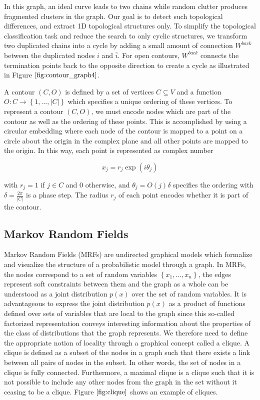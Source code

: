 \documentclass{SMBV12}
\begin{document}
In this graph, an ideal curve leads to two chains while random clutter produces fragmented clusters in the graph. Our goal is to detect such topological differences, and extract 1D topological structures only. To simplify the topological classification task and reduce the search to only cyclic structures, we transform two duplicated chains into a cycle by adding a small amount of connection $W^{back}$ between the duplicated nodes $i$ and $\bar{i}$. For open contours, $W^{back}$ connects the termination points back to the opposite direction to create a cycle as illustrated in Figure $\ref{fig:contour_graph4}$.

A contour $(C, O)$ is defined by a set of vertices $C \subseteq V$ and a function $O: C \rightarrow \left\lbrace 1, ..., \lvert C \rvert \right\rbrace$ which specifies a unique ordering of these vertices. To represent a contour $(C, O)$, we must encode nodes which are part of the contour as well as the ordering
of these points. This is accomplished by using a circular embedding where each node of the contour is mapped to a point on a circle about the origin in the complex plane and all other points are mapped to the origin. In this way, each point is represented as complex number

\begin{equation}
x_j = r_j \exp(i \theta_j)
\end{equation}

with $r_j = 1$ if $j \in C$ and $0$ otherwise, and $\theta_j = O(j) \delta$ specifies the ordering with $\delta = \frac{2\pi}{\lvert C \rvert}$ is a phase step. The radius $r_j$ of each point encodes whether it is part of the contour.

\subsection{Markov Random Fields}
\label{sec:mrf}
Markov Random Fields (MRFs) are undirected graphical models which formalize and visualize the structure of a probabilistic model through a graph. In MRFs, the nodes correspond to a set of random variables $\left\lbrace x_1, ..., x_n\right\rbrace $, the edges represent soft constraints between them and the graph as a whole can be understood as a joint distribution $p(x)$ over the set of random variables. It is advantageous to express the joint distribution $p(x)$ as a product of functions defined over sets of variables that are local to the graph since this so-called factorized representation conveys interesting information about the properties of the class of distributions that the graph represents. We therefore need to define the appropriate notion of locality through a graphical concept called a clique. A clique is defined as a subset of the nodes in a graph such that there exists a link between all pairs of nodes in the subset. In other words, the set of nodes in a clique is fully connected. Furthermore, a maximal clique is a clique such that it is not possible to include any
other nodes from the graph in the set without it ceasing to be a clique. Figure $\ref{fig:clique}$ shows an example of cliques.
\end{document}
